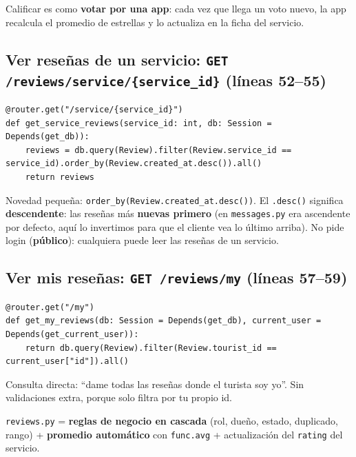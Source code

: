 \documentclass[11pt,a4paper]{article}
\begin{document}
\begin{analogia}
Calificar es como \textbf{votar por una app}: cada vez que llega un voto nuevo, la app
recalcula el promedio de estrellas y lo actualiza en la ficha del servicio.
\end{analogia}

\subsection{Ver reseñas de un servicio: \texttt{GET /reviews/service/\{service\_id\}} (líneas 52--55)}

\begin{lstlisting}
@router.get("/service/{service_id}")
def get_service_reviews(service_id: int, db: Session = Depends(get_db)):
    reviews = db.query(Review).filter(Review.service_id == service_id).order_by(Review.created_at.desc()).all()
    return reviews
\end{lstlisting}

Novedad pequeña: \texttt{order\_by(Review.created\_at.desc())}. El \texttt{.desc()} significa
\textbf{descendente}: las reseñas más \textbf{nuevas primero} (en \texttt{messages.py} era
ascendente por defecto, aquí lo invertimos para que el cliente vea lo último arriba).
No pide login (\textbf{público}): cualquiera puede leer las reseñas de un servicio.

\subsection{Ver mis reseñas: \texttt{GET /reviews/my} (líneas 57--59)}

\begin{lstlisting}
@router.get("/my")
def get_my_reviews(db: Session = Depends(get_db), current_user = Depends(get_current_user)):
    return db.query(Review).filter(Review.tourist_id == current_user["id"]).all()
\end{lstlisting}

Consulta directa: ``dame todas las reseñas donde el turista soy yo''. Sin validaciones extra,
porque solo filtra por tu propio id.

\begin{recuadro}
\texttt{reviews.py} = \textbf{reglas de negocio en cascada} (rol, dueño, estado, duplicado, rango)
+ \textbf{promedio automático} con \texttt{func.avg} + actualización del \texttt{rating} del servicio.
\end{recuadro}

\end{document}
